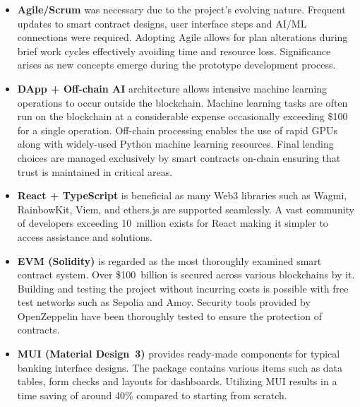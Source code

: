 \documentclass[12pt,a4paper]{report}
\begin{document}
\begin{itemize}[noitemsep]
\item \textbf{Agile/Scrum} was necessary due to the project's evolving nature. Frequent updates to smart contract designs, user interface steps and AI/ML connections were required. Adopting Agile allows for plan alterations during brief work cycles effectively avoiding time and resource loss. Significance arises as new concepts emerge during the prototype development process.

\item \textbf{DApp + Off-chain AI} architecture allows intensive machine learning operations to occur outside the blockchain. Machine learning tasks are often run on the blockchain at a considerable expense occasionally exceeding \$100 for a single operation. Off-chain processing enables the use of rapid GPUs along with widely-used Python machine learning resources. Final lending choices are managed exclusively by smart contracts on-chain ensuring that trust is maintained in critical areas.

\item \textbf{React + TypeScript} is beneficial as many Web3 libraries such as Wagmi, RainbowKit, Viem, and ethers.js are supported seamlessly. A vast community of developers exceeding 10~million exists for React making it simpler to access assistance and solutions.

\item \textbf{EVM (Solidity)} is regarded as the most thoroughly examined smart contract system. Over \$100~billion is secured across various blockchains by it. Building and testing the project without incurring costs is possible with free test networks such as Sepolia and Amoy. Security tools provided by OpenZeppelin have been thoroughly tested to ensure the protection of contracts.

\item \textbf{MUI (Material Design~3)} provides ready-made components for typical banking interface designs. The package contains various items such as data tables, form checks and layouts for dashboards. Utilizing MUI results in a time saving of around 40\% compared to starting from scratch.


\end{itemize}
\end{document}
